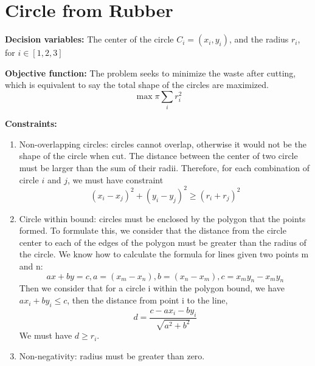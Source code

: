 




\section{Circle from Rubber}

\textbf{Decision variables:} The center of the circle $C_i=(x_i, y_i)$, and the radius $r_i$, for $i \in [1, 2, 3]$

\textbf{Objective function:} The problem seeks to minimize the waste after cutting, which is equivalent to say the total shape of the circles are maximized. 
$$
\max \pi\sum_i r_i^2
$$

\textbf{Constraints:}
\begin{enumerate}
    \item Non-overlapping circles: circles cannot overlap, otherwise it would not be the shape of the circle when cut. The distance between the center of two circle must be larger than the sum of their radii. Therefore, for each combination of circle $i$ and $j$, we must have constraint
    $$
    (x_i - x_j)^2 + (y_i - y_j)^2 \geq (r_i + r_j)^2
    $$
    
    \item Circle within bound: circles must be enclosed by the polygon that the points formed. To formulate this, we consider that the distance from the circle center to each of the edges of the polygon must be greater than the radius of the circle. We know how to calculate the formula for lines given two points m and n:
    $$
    ax + by = c, a = (x_m - x_n), b = (x_n - x_m), c = x_my_n - x_my_n
    $$
    Then we consider that for a circle i within the polygon bound, we have $ax_i + by_i \leq c$, then the distance from point i to the line,
    $$
    d = \frac{c - ax_i - by_i}{\sqrt{a^2 + b^2}}
    $$
    We must have $d \geq r_i$.
    
    \item Non-negativity: radius must be greater than zero.
\end{enumerate}

